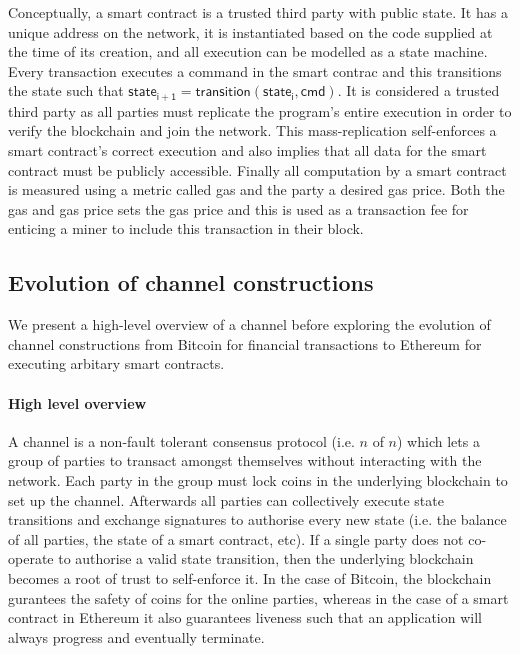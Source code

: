 \documentclass{llncs}
\newcommand{\stateinfoi}{\mathsf{state}_{\mathsf{i}}}
\newcommand{\stateinfoplus}{\mathsf{state}_{\mathsf{i+1}}}
\begin{document}
Conceptually, a smart contract is a trusted third party with public state. 
It has a unique address on the network, it is instantiated based on the code supplied at the time of its creation, and all execution can be modelled as a state machine. 
Every transaction executes a command in the smart contrac and this transitions the state such that $\stateinfoplus = \mathsf{transition}(\stateinfoi, \mathsf{cmd})$. 
It is considered a trusted third party as all parties must replicate the program's entire execution in order to verify the blockchain and join the network.  
This mass-replication self-enforces a smart contract's correct execution and also implies that all data for the smart contract must be publicly accessible. 
Finally all computation by a smart contract is measured using a metric called gas and the party a desired gas price. 
Both the gas and gas price sets the gas price and this is used as a transaction fee for enticing a miner to include this transaction in their block. 

\subsection{Evolution of channel constructions}

We present a high-level overview of a channel before exploring the evolution of channel constructions from  Bitcoin for financial transactions to Ethereum for executing arbitary smart contracts. 

\paragraph{High level overview}
A channel is a non-fault tolerant consensus protocol (i.e. $n$ of $n$) which lets a group of parties to transact amongst themselves without interacting with the network. 
Each party in the group must lock coins in the underlying blockchain to set up the channel. 
Afterwards all parties can collectively execute state transitions and exchange signatures to authorise every new state (i.e. the balance of all parties, the state of a smart contract, etc). 
If a single party does not co-operate to authorise a valid state transition, then the underlying blockchain becomes a root of trust to self-enforce it. 
In the case of Bitcoin, the blockchain gurantees the safety of coins for the online parties, whereas in the case of a smart contract in Ethereum it also guarantees liveness such that an application will always progress and eventually terminate. 
\end{document}
